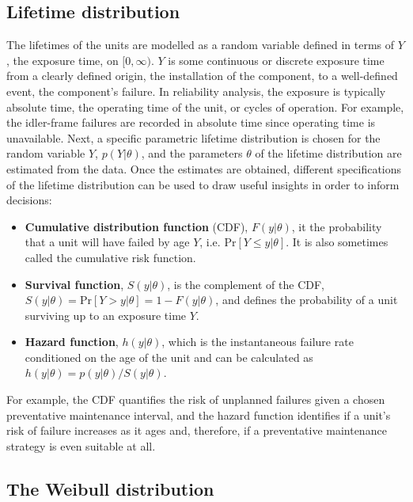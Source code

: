 \subsection{Lifetime distribution}

The lifetimes of the units are modelled as a random variable defined in terms of $Y$, the exposure time, on $[0, \infty)$. $Y$ is some continuous or discrete exposure time from a clearly defined origin, the installation of the component, to a well-defined event, the component's failure. In reliability analysis, the exposure is typically absolute time, the operating time of the unit, or cycles of operation. For example, the idler-frame failures are recorded in absolute time since operating time is unavailable. Next, a specific parametric lifetime distribution is chosen for the random variable $Y$, $p(Y|\theta)$, and the parameters $\theta$ of the lifetime distribution are estimated from the data. Once the estimates are obtained, different specifications of the lifetime distribution can be used to draw useful insights in order to inform decisions:
\begin{itemize}
    \item \textbf{Cumulative distribution function} (CDF), $F(y|\theta)$, it the probability that a unit will have failed by age $Y$, i.e. $\text{Pr}\left[Y \le y|\theta\right]$. It is also sometimes called the cumulative risk function.
    \item \textbf{Survival function}, $S(y|\theta)$, is the complement of the CDF, $S(y|\theta) = \text{Pr}\left[Y > y|\theta\right] = 1 - F(y|\theta)$, and defines the probability of a unit surviving up to an exposure time $Y$.
    \item \textbf{Hazard function}, $h(y|\theta)$, which is the instantaneous failure rate conditioned on the age of the unit and can be calculated as $h(y|\theta) = p(y|\theta) / S(y|\theta)$.
\end{itemize}
For example, the CDF quantifies the risk of unplanned failures given a chosen preventative maintenance interval, and the hazard function identifies if a unit's risk of failure increases as it ages and, therefore, if a preventative maintenance strategy is even suitable at all.

\subsection{The Weibull distribution} \label{subsec:weibull-dist}

